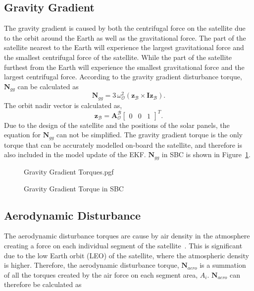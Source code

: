 \subsection{Gravity Gradient}
The gravity gradient is caused by both the centrifugal force on the satellite due to the orbit around the Earth as well as the gravitational force. The part of the satellite nearest to the Earth will experience the largest gravitational force and the smallest centrifugal force of the satellite. While the part of the satellite furthest from the Earth will experience the smallest gravitational force and the largest centrifugal force. According to \cite{wertz2012spacecraft} the gravity gradient disturbance torque, $\mathbf{N}_{gg}$ can be calculated as 
\begin{equation}
\boldsymbol{N}_{gg} = 3 \, \omega_\mathcal{O}^2 (\mathbf{z}_{\mathcal{B}} \times \mathbf{Iz}_{\mathcal{B}}).
\end{equation}
The orbit nadir vector is calculated as,
\begin{equation}
\mathbf{z}_{\mathcal{B}} = \boldsymbol{A}^{\mathcal{B}}_{\mathcal{O}} \begin{bmatrix} 0 & 0 & 1 \end{bmatrix}^T.
\end{equation}
Due to the design of the satellite and the positions of the solar panels, the equation for $\mathbf{N}_{gg}$ can not be simplified. The gravity gradient torque is the only torque that can be accurately modelled on-board the satellite, and therefore is also included in the model update of the EKF. $\mathbf{N}_{gg}$ in SBC is shown in Figure~\ref{fig:GravityGradientTorques}.

\begin{figure}[!htb]
	\centering
	\def\pgfwidth{10cm}
	{Gravity Gradient Torques.pgf}
	
	\caption{Gravity Gradient Torque in SBC}
	\label{fig:GravityGradientTorques}
\end{figure}

\subsection{Aerodynamic Disturbance}
The aerodynamic disturbance torques are cause by air density in the atmosphere creating a force on each individual segment of the satellite~\cite{Steyn2014}. This is significant due to the low Earth orbit (LEO) of the satellite, where the atmospheric density is higher. Therefore, the aerodynamic disturbance torque, $\mathbf{N}_{aero}$ is a summation of all the torques created by the air force on each segment area, $A_i$. $\mathbf{N}_{aero}$ can therefore be calculated as

